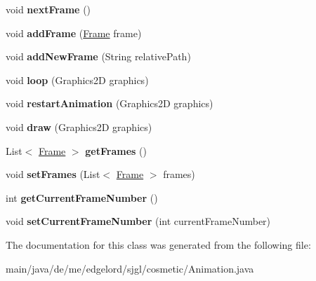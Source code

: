 \begin{DoxyCompactItemize}
void {\bfseries next\+Frame} ()
\item 
\mbox{\label{classde_1_1me_1_1edgelord_1_1sjgl_1_1cosmetic_1_1_animation_a7c41de49f5cd1ab81296ff819075e493}} 
void {\bfseries add\+Frame} (\mbox{\hyperlink{classde_1_1me_1_1edgelord_1_1sjgl_1_1cosmetic_1_1_frame}{Frame}} frame)
\item 
\mbox{\label{classde_1_1me_1_1edgelord_1_1sjgl_1_1cosmetic_1_1_animation_aaf842f4027f364ddb627f2a633283b0b}} 
void {\bfseries add\+New\+Frame} (String relative\+Path)
\item 
\mbox{\label{classde_1_1me_1_1edgelord_1_1sjgl_1_1cosmetic_1_1_animation_a3cd5c5dc784938a7348fe73eb8cc3db1}} 
void {\bfseries loop} (Graphics2D graphics)
\item 
\mbox{\label{classde_1_1me_1_1edgelord_1_1sjgl_1_1cosmetic_1_1_animation_aea8229b243256efa32236d44e7fff461}} 
void {\bfseries restart\+Animation} (Graphics2D graphics)
\item 
\mbox{\label{classde_1_1me_1_1edgelord_1_1sjgl_1_1cosmetic_1_1_animation_a87b3ee3536d02150e328ec0a6a773313}} 
void {\bfseries draw} (Graphics2D graphics)
\item 
\mbox{\label{classde_1_1me_1_1edgelord_1_1sjgl_1_1cosmetic_1_1_animation_a5b7a10cfbef1faf09d34894f558410a5}} 
List$<$ \mbox{\hyperlink{classde_1_1me_1_1edgelord_1_1sjgl_1_1cosmetic_1_1_frame}{Frame}} $>$ {\bfseries get\+Frames} ()
\item 
\mbox{\label{classde_1_1me_1_1edgelord_1_1sjgl_1_1cosmetic_1_1_animation_ae8c91d054725e3b76e066b01326051d7}} 
void {\bfseries set\+Frames} (List$<$ \mbox{\hyperlink{classde_1_1me_1_1edgelord_1_1sjgl_1_1cosmetic_1_1_frame}{Frame}} $>$ frames)
\item 
\mbox{\label{classde_1_1me_1_1edgelord_1_1sjgl_1_1cosmetic_1_1_animation_a5f7b02edb1dd8eb0e65774c38273c3a7}} 
int {\bfseries get\+Current\+Frame\+Number} ()
\item 
\mbox{\label{classde_1_1me_1_1edgelord_1_1sjgl_1_1cosmetic_1_1_animation_a48454361617c9315c177b0df1a54ef2c}} 
void {\bfseries set\+Current\+Frame\+Number} (int current\+Frame\+Number)
\end{DoxyCompactItemize}


The documentation for this class was generated from the following file\+:\begin{DoxyCompactItemize}
\item 
main/java/de/me/edgelord/sjgl/cosmetic/Animation.\+java\end{DoxyCompactItemize}
